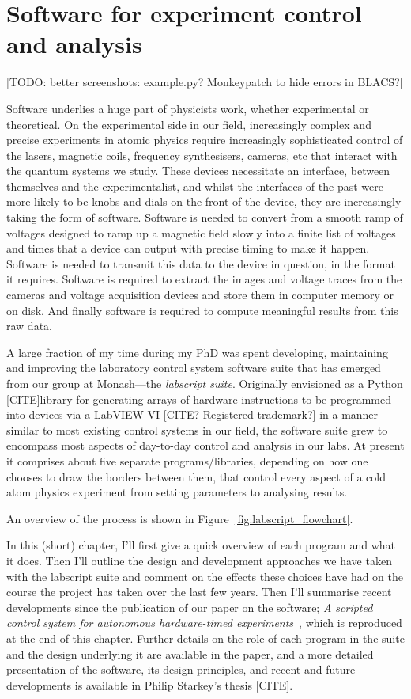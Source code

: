 \chapter{Software for experiment control and analysis}\label{chap:software}

[TODO: better screenshots: example.py? Monkeypatch to hide errors in BLACS?]

Software underlies a huge part of physicists work, whether experimental or theoretical. On the experimental side in our field, increasingly complex and precise experiments in atomic physics require increasingly sophisticated control of the lasers, magnetic coils, frequency synthesisers, cameras, etc that interact with the quantum systems we study. These devices necessitate an interface, between themselves and the experimentalist, and whilst the interfaces of the past were more likely to be knobs and dials on the front of the device, they are increasingly taking the form of software. Software is needed to convert from a smooth ramp of voltages designed to ramp up a magnetic field slowly into a finite list of voltages and times that a device can output with precise timing to make it happen. Software is needed to transmit this data to the device in question, in the format it requires. Software is required to extract the images and voltage traces from the cameras and voltage acquisition devices and store them in computer memory or on disk. And finally software is required to compute meaningful results from this raw data.

A large fraction of my time during my PhD was spent developing, maintaining and improving the laboratory control system software suite that has emerged from our group at Monash---the \emph{labscript suite}. Originally envisioned as a Python [CITE]library for generating arrays of hardware instructions to be programmed into devices via a LabVIEW VI [CITE? Registered trademark?] in a manner similar to most existing control systems in our field, the software suite grew to encompass most aspects of day-to-day control and analysis in our labs. At present it comprises about five separate programs/libraries, depending on how one chooses to draw the borders between them, that control every aspect of a cold atom physics experiment from setting parameters to analysing results.

An overview of the process is shown in Figure~\ref{fig:labscript_flowchart}.

In this (short) chapter, I'll first give a quick overview of each program and what it does. Then I'll outline the design and development approaches we have taken with the labscript suite and comment on the effects these choices have had on the course the project has taken over the last few years. Then I'll summarise recent developments since the publication of our paper on the software; \emph{A scripted control system for autonomous hardware-timed experiments}~\cite{starkey_scripted_2013}, which is reproduced at the end of this chapter. Further details on the role of each program in the suite and the design underlying it are available in the paper, and a more detailed presentation of the software, its design principles, and recent and future developments is available in Philip Starkey's thesis [CITE].

